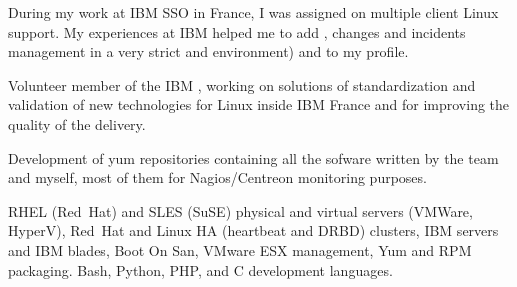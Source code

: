 %
%
%
%



During my work at IBM SSO in France, I was assigned on multiple client Linux
support. My experiences at IBM helped me to add ,
 changes and incidents management in a very strict
 and  environment) and 
to my profile. 

Volunteer member of the IBM , working on
solutions of standardization and validation of new technologies for Linux
inside IBM France and for improving the quality of the delivery.

Development of yum repositories containing all the sofware written by the team
and myself, most of them for Nagios/Centreon monitoring purposes.

\tinyskip\noindent
\technologies
RHEL (Red~Hat) and SLES (SuSE) physical and virtual
servers (VMWare, HyperV),
Red~Hat and Linux HA (heartbeat and DRBD) clusters,
IBM servers and IBM blades, Boot On San,
VMware ESX management,
Yum and RPM packaging.
Bash, Python, PHP, and C development languages.

